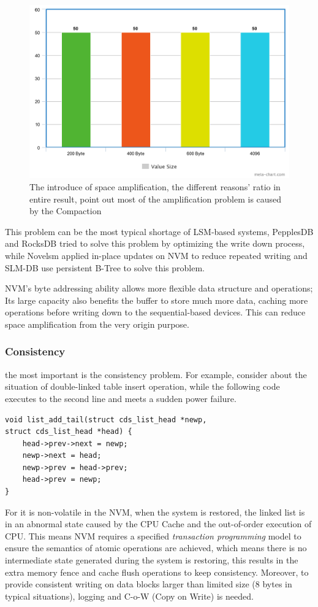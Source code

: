 \begin{figure}
	\centering
	\includegraphics[width=0.7\columnwidth]{fig/meta2}
	\caption{The introduce of space amplification, the different reasons' ratio in entire result, point out most of the amplification problem is caused by the Compaction}
	\label{fig:space_amplification}
\end{figure}

This problem can be the most typical shortage of LSM-based systems, PepplesDB\cite{raju2017pebblesdb} and RocksDB\cite{dong2017optimizing} tried to solve this problem by optimizing the write down process, while Novelsm\cite{kannan2018redesigning} applied in-place updates on NVM to reduce repeated writing and SLM-DB use persistent B-Tree to solve this problem.

NVM's byte addressing ability allows more flexible data structure and operations; Its large capacity also benefits the buffer to store much more data, caching more operations before writing down to the sequential-based devices. This can reduce space amplification from the very origin purpose.

\subsubsection{Consistency}

the most important is the consistency problem. For example, consider about the situation of double-linked table insert operation, while the following code executes to the second line and meets a sudden power failure.
\begin{verbatim}
void list_add_tail(struct cds_list_head *newp,
struct cds_list_head *head) {
	head->prev->next = newp;
	newp->next = head;
	newp->prev = head->prev;
	head->prev = newp;
}
\end{verbatim}
For it is non-volatile in the NVM, when the system is restored, the linked list is in an abnormal state caused by the CPU Cache and the out-of-order execution of CPU. This means NVM requires a specified \textit{transaction programming} model\cite{dulloor2014system,ren2015thynvm} to ensure the semantics of atomic operations are achieved, which means there is no intermediate state generated during the system is restoring, this results in the extra memory fence and cache flush operations to keep consistency. Moreover, to provide consistent writing on data blocks larger than limited size (8 bytes in typical situations), logging and C-o-W (Copy on Write) is needed.

